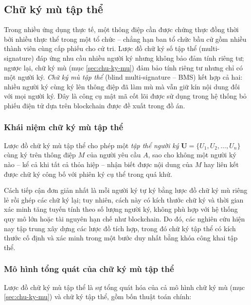 \subsection{Chữ ký mù tập thể}
\label{sec:chu-ky-mu-tap-the}

Trong nhiều ứng dụng thực tế, một thông điệp cần được chứng thực đồng thời bởi nhiều thực thể trong một tổ chức -- chẳng hạn ban tổ chức bầu cử gồm nhiều thành viên cùng cấp phiếu cho cử tri. Lược đồ chữ ký số tập thể (multi-signature) đáp ứng nhu cầu nhiều người ký nhưng không bảo đảm tính riêng tư; ngược lại, chữ ký mù (mục \ref{sec:chu-ky-mu}) đảm bảo tính riêng tư nhưng chỉ có một người ký. \textit{Chữ ký mù tập thể} (blind multi-signature -- BMS) kết hợp cả hai: nhiều người ký cùng ký lên thông điệp đã làm mù mà vẫn giữ kín nội dung đối với mọi người ký. Đây là công cụ mật mã cốt lõi được sử dụng trong hệ thống bỏ phiếu điện tử dựa trên blockchain được đề xuất trong đồ án.

\subsubsection{Khái niệm chữ ký mù tập thể}

Lược đồ chữ ký mù tập thể cho phép một \textit{tập thể người ký} $\mathbf{U} = \{U_1, U_2, \ldots, U_n\}$ cùng ký trên thông điệp $M$ của người yêu cầu $A$, sao cho không một người ký nào -- kể cả khi tất cả thỏa hiệp -- nhận biết được nội dung của $M$ hay liên kết được chữ ký công bố với phiên ký cụ thể trong quá khứ.

Cách tiếp cận đơn giản nhất là mỗi người ký tự ký bằng lược đồ chữ ký mù riêng lẻ rồi ghép các chữ ký lại; tuy nhiên, cách này có kích thước chữ ký và thời gian xác minh tăng tuyến tính theo số lượng người ký, không phù hợp với hệ thống quy mô lớn hoặc tài nguyên hạn chế như blockchain. Do đó, các nghiên cứu hiện nay tập trung xây dựng các lược đồ tích hợp, trong đó chữ ký tập thể có kích thước cố định và xác minh trong một bước duy nhất bằng khóa công khai tập thể.

\subsubsection{Mô hình tổng quát của chữ ký mù tập thể}

Lược đồ chữ ký mù tập thể là sự tổng quát hóa của cả mô hình chữ ký mù (mục \ref{sec:chu-ky-mu}) và chữ ký tập thể, gồm bốn thuật toán chính:

